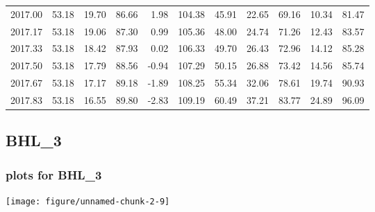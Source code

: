 \documentclass[10pt,a4paper]{article}\usepackage[]{graphicx}\usepackage[]{color}
\makeatletter
\def\maxwidth{ %
  \ifdim\Gin@nat@width>\linewidth
    \linewidth
  \else
    \Gin@nat@width
  \fi
}
\newcommand{\AaA}{\_}
\makeatother
\begin{document}
\begin{table}[ht]
\begin{tabular}{rrrrrrrrrrr}
  2017.00 & 53.18 & 19.70 & 86.66 & 1.98 & 104.38 & 45.91 & 22.65 & 69.16 & 10.34 & 81.47 \\ 
  2017.17 & 53.18 & 19.06 & 87.30 & 0.99 & 105.36 & 48.00 & 24.74 & 71.26 & 12.43 & 83.57 \\ 
  2017.33 & 53.18 & 18.42 & 87.93 & 0.02 & 106.33 & 49.70 & 26.43 & 72.96 & 14.12 & 85.28 \\ 
  2017.50 & 53.18 & 17.79 & 88.56 & -0.94 & 107.29 & 50.15 & 26.88 & 73.42 & 14.56 & 85.74 \\ 
  2017.67 & 53.18 & 17.17 & 89.18 & -1.89 & 108.25 & 55.34 & 32.06 & 78.61 & 19.74 & 90.93 \\ 
  2017.83 & 53.18 & 16.55 & 89.80 & -2.83 & 109.19 & 60.49 & 37.21 & 83.77 & 24.89 & 96.09 \\ 
   \hline
\end{tabular}
\end{table}

\newpage
\subsection{BHL\AaA 3}
\subsubsection{plots for BHL\AaA 3}

\texttt{[image: figure/unnamed-chunk-2-9]} 

\newpage
\end{document}
